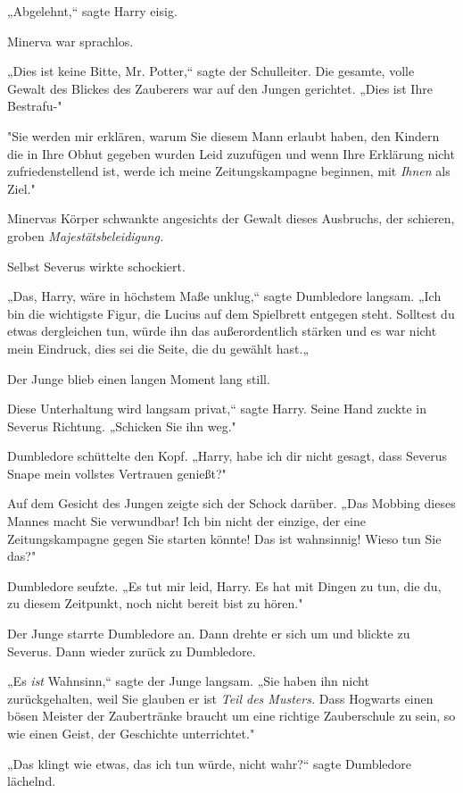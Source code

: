 {„Abgelehnt,“ sagte Harry eisig.

Minerva war sprachlos.

„Dies ist keine Bitte, Mr. Potter,“ sagte der Schulleiter. Die gesamte, volle Gewalt des Blickes des Zauberers war auf den Jungen gerichtet. „Dies ist Ihre Bestrafu-"

"Sie werden mir erklären, warum Sie diesem Mann erlaubt haben, den Kindern die in Ihre Obhut gegeben wurden Leid zuzufügen und wenn Ihre Erklärung nicht zufriedenstellend ist, werde ich meine Zeitungskampagne beginnen, mit \emph{Ihnen} als Ziel."

Minervas Körper schwankte angesichts der Gewalt dieses Ausbruchs, der schieren, groben \emph{Majestätsbeleidigung.}

Selbst Severus wirkte schockiert.

„Das, Harry, wäre in höchstem Maße unklug,“ sagte Dumbledore langsam. „Ich bin die wichtigste Figur, die Lucius auf dem Spielbrett entgegen steht. Solltest du etwas dergleichen tun, würde ihn das außerordentlich stärken und es war nicht mein Eindruck, dies sei die Seite, die du gewählt hast.„

Der Junge blieb einen langen Moment lang still.

Diese Unterhaltung wird langsam privat,“ sagte Harry. Seine Hand zuckte in Severus Richtung. „Schicken Sie ihn weg."

Dumbledore schüttelte den Kopf. „Harry, habe ich dir nicht gesagt, dass Severus Snape mein vollstes Vertrauen genießt?"

Auf dem Gesicht des Jungen zeigte sich der Schock darüber. „Das Mobbing dieses Mannes macht Sie verwundbar! Ich bin nicht der einzige, der eine Zeitungskampagne gegen Sie starten könnte! Das ist wahnsinnig! Wieso tun Sie das?"

Dumbledore seufzte. „Es tut mir leid, Harry. Es hat mit Dingen zu tun, die du, zu diesem Zeitpunkt, noch nicht bereit bist zu hören."

Der Junge starrte Dumbledore an. Dann drehte er sich um und blickte zu Severus. Dann wieder zurück zu Dumbledore.

„Es \emph{ist} Wahnsinn,“ sagte der Junge langsam. „Sie haben ihn nicht zurückgehalten, weil Sie glauben er ist \emph{Teil des Musters.} Dass Hogwarts einen bösen Meister der Zaubertränke braucht um eine richtige Zauberschule zu sein, so wie einen Geist, der Geschichte unterrichtet."

„Das klingt wie etwas, das ich tun würde, nicht wahr?“ sagte Dumbledore lächelnd.

}

